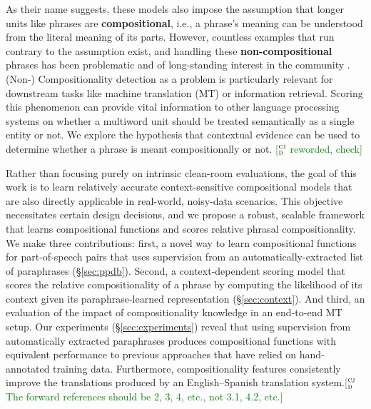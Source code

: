 \documentclass[11pt]{article}
\newcommand{\ensuretext}[1]{#1}
\newcommand{\clabcomment}[3]{\ensuretext{\textcolor{#3}{[#1 #2]}}}
\newcommand{\cjdmarker}{\ensuretext{\textcolor{green}{\ensuremath{^{\textsc{cj}}_{\textsc{d}}}}}}
\newcommand{\cjd}[1]{\clabcomment{\cjdmarker}{#1}{green}}
\begin{document}
As their name suggests, these models also impose the assumption that longer units like phrases are \textbf{compositional}, i.e., a phrase's meaning can be understood from the literal meaning of its parts. 
However, countless examples that run contrary to the assumption exist, and handling these \textbf{non-compositional} phrases has been problematic and of long-standing interest in the community \cite{Lin1999,Sag2002}.
(Non-) Compositionality detection as a problem is particularly relevant for downstream tasks like machine translation (MT) or information retrieval. 
Scoring this phenomenon can provide vital information to other language processing systems on whether a multiword unit should be treated semantically as a single entity or not. We explore the hypothesis that contextual evidence can be used to determine whether a phrase is meant compositionally or not. \cjd{reworded, check}


Rather than focusing purely on intrinsic clean-room evaluations, the goal of this work is to learn relatively accurate context-sensitive compositional models that are also directly applicable in real-world, noisy-data scenarios. 
This objective necessitates certain design decisions, and we propose a robust, scalable framework that learns compositional functions and scores relative phrasal compositionality.  
We make three contributions: first, a novel way to learn compositional functions for part-of-speech pairs that uses supervision from an automatically-extracted list of paraphrases (\S\ref{sec:ppdb}). 
Second, a context-dependent scoring model that scores the relative compositionality of a phrase \cite{McCarthy2003} by computing the likelihood of its context given its paraphrase-learned representation (\S\ref{sec:context}). 
And third, an evaluation of the impact of compositionality knowledge in an end-to-end MT setup.
Our experiments (\S\ref{sec:experiments}) reveal that using supervision from automatically extracted paraphrases produces compositional functions with equivalent performance to previous approaches that have relied on hand-annotated training data. 
Furthermore, compositionality features consistently improve the translations produced by an English--Spanish translation system.\cjd{The forward references should be 2, 3, 4, etc., not 3.1, 4.2, etc.}
\end{document}
